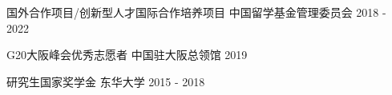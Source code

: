 

\begin{cvhonors}

 \cvhonor
    {\quad 国外合作项目/创新型人才国际合作培养项目} %
    {中国留学基金管理委员会} %
    {} %
    {2018 - 2022} %

 \cvhonor
    {\quad G20大阪峰会优秀志愿者} %
    {中国驻大阪总领馆} %
    {} %
    {2019} %

 \cvhonor
    {\quad 研究生国家奖学金} %
    {东华大学} %
    {} %
    {2015 - 2018} %
\end{cvhonors}
